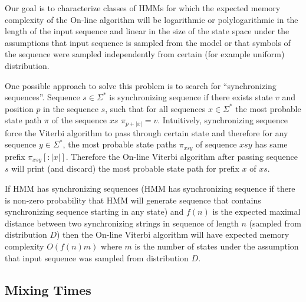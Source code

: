 Our goal is to characterize classes of HMMs for which  the expected memory
complexity of the On-line algorithm will be logarithmic or polylogarithmic in
the length of the input sequence and linear in the size of the state space
under the assumptions that input sequence is sampled from the model or that
symbols of the sequence were sampled independently from certain (for example
uniform) distribution.


One possible approach to solve this problem is to search for ``synchronizing
sequences''. Sequence $s\in\Sigma^*$ is synchronizing sequence if there exists
state $v$ and position $p$ in the sequence $s$, such that for all sequences
$x\in \Sigma^*$ the most probable state path $\pi$ of the sequence $xs$
$\pi_{p+|x|}=v$. Intuitively, synchronizing sequence force the Viterbi algorithm
to pass through certain state and therefore for any sequence $y\in \Sigma^*$,
the most probable state paths $\pi_{xsy}$ of sequence $xsy$ has same prefix
$\pi_{xsy}[:|x|]$. Therefore the On-line Viterbi algorithm after passing
sequence $s$ will print (and discard) the most probable state path for prefix
$x$ of $xs$. 

If HMM has synchronizing sequences (HMM has synchronizing sequence if there is
non-zero probability that HMM will generate sequence that contains synchronizing
sequence starting in any state) and $f(n)$ is the expected maximal distance
between two synchronizing strings in sequence of length $n$ (sampled from
distribution $D$) then the On-line Viterbi algorithm will have expected memory
complexity $O(f(n)m)$ where $m$ is the number of states under the assumption
that input sequence was sampled from distribution $D$. 


\subsection{Mixing Times}

